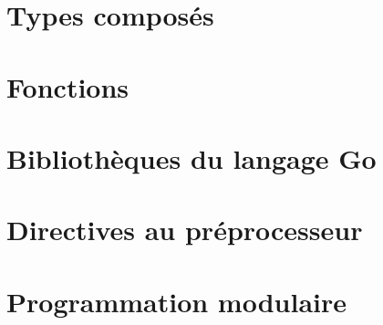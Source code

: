 \documentclass[11pt]{article}
\begin{document}
\section{Types composés}

\section{Fonctions}

\section{Bibliothèques du langage Go}

\section{Directives au préprocesseur}

\section{Programmation modulaire}
\end{document}
